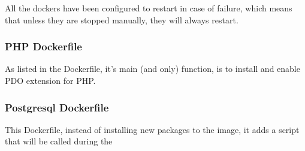     \begin{flushleft}
        All the dockers have been configured to restart in case of failure, which means that unless they are stopped manually,
        they will always restart.
    \end{flushleft}


    \newpage
    \subsubsection[PHP Dockerfile]{PHP Dockerfile}
    
    \begin{flushleft}
        As listed in the Dockerfile, it's main (and only) function, is to install and enable PDO extension for PHP\@.
    \end{flushleft}

    \newpage
    \subsubsection[Postgresql Dockerfile]{Postgresql Dockerfile}
    
    \begin{flushleft}
        This Dockerfile, instead of installing new packages to the image, it adds a script that will be called during the
    \end{flushleft}